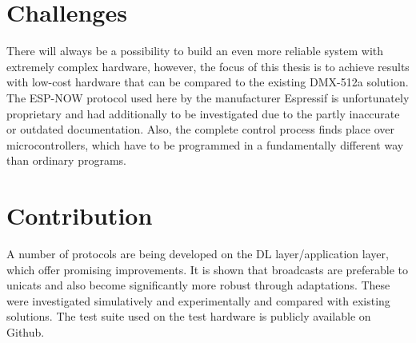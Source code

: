 \section*{Challenges}

There will always be a possibility to build an even more reliable system with extremely complex hardware,
however, the focus of this thesis is to achieve results with low-cost hardware that can be compared 
to the existing DMX-512a solution.
The ESP-NOW protocol used here by the manufacturer Espressif is unfortunately proprietary
and had additionally to be investigated due to the partly inaccurate or outdated documentation.
Also, the complete control process finds place over microcontrollers, 
which have to be programmed in a fundamentally different way than ordinary programs.

\section*{Contribution}

A number of protocols are being developed on the DL layer/application layer,
which offer promising improvements.
It is shown that broadcasts are preferable to unicats
and also become significantly more robust through adaptations.
These were investigated simulatively and experimentally and compared with existing solutions.
The test suite used on the test hardware is publicly available on Github.

